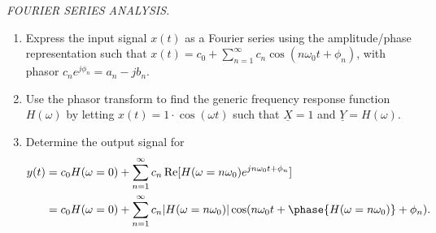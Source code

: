 \documentclass{report}
\begin{document}
\begin{tcolorbox}[width=\textwidth,colback={white}, sharp corners]
\emph{FOURIER SERIES ANALYSIS.}
    \begin{enumerate}
        \item Express the input signal $x(t)$ as a Fourier series using the amplitude/phase representation such that $x(t) = c_0 + \displaystyle\sum_{n=1}^{\infty} c_n\cos(n\omega_0 t + \phi_n)$, with phasor $c_n e^{j\phi_n} = a_n - jb_n$.
        \item Use the phasor transform to find the generic frequency response function $H(\omega)$ by letting $x(t) = 1\cdot\cos(\omega t)$ such that $\underline{X}=1$ and $\underline{Y}=H(\omega)$.
        \item Determine the output signal for 
        \begin{align*}
            y(t) &= c_0H(\omega=0) + \displaystyle\sum_{n=1}^{\infty}c_n\Re[H(\omega=n\omega_0)e^{jn\omega_0 t+\phi_n}] \\
            &= c_0H(\omega=0) + \displaystyle\sum_{n=1}^{\infty}c_n|H(\omega=n\omega_0)|\cos(n\omega_0 t + \phase{H(\omega=n\omega_0)} +\phi_n).
        \end{align*}
    \end{enumerate}
\end{tcolorbox}
\end{document}
